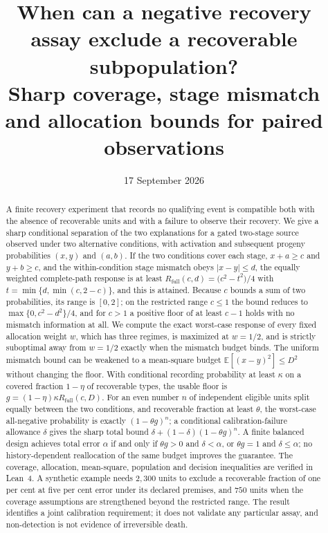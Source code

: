 \documentclass[11pt]{article}
\title{When can a negative recovery assay exclude a recoverable
subpopulation?\\[4pt]
\large Sharp coverage, stage mismatch and allocation bounds for paired
observations}
\author{\PaperAuthor}
\date{17 September 2026}
\theoremstyle{definition}
\theoremstyle{remark}
\newcommand{\E}{\mathbb{E}}
\newcommand{\Rfull}{R_{\mathrm{full}}}
\begin{document}
\maketitle

\begin{abstract}
A finite recovery experiment that records no qualifying event is compatible both
with the absence of recoverable units and with a failure to observe their
recovery. We give a sharp conditional separation of the two explanations for a
gated two-stage source observed under two alternative conditions, with
activation and subsequent progeny probabilities $(x,y)$ and $(a,b)$. If the two
conditions cover each stage, $x+a\ge c$ and $y+b\ge c$, and the within-condition
stage mismatch obeys $|x-y|\le d$, the equally weighted complete-path response
is at least $\Rfull(c,d)=\bigl(c^2-t^2\bigr)/4$ with $t=\min\{d,\min(c,2-c)\}$,
and this is attained. Because $c$ bounds a sum of two probabilities, its range
is $[0,2]$; on the restricted range $c\le1$ the bound reduces to
$\max\{0,c^2-d^2\}/4$, and for $c>1$ a positive floor of at least $c-1$ holds
with no mismatch information at all. We compute the exact worst-case response of
every fixed allocation weight $w$, which has three regimes, is maximized at
$w=1/2$, and is strictly suboptimal away from $w=1/2$ exactly when the mismatch
budget binds. The uniform mismatch bound can be weakened to a mean-square budget
$\E[(x-y)^2]\le D^2$ without changing the floor. With conditional recording
probability at least $\kappa$ on a covered fraction $1-\eta$ of recoverable
types, the usable floor is $g=(1-\eta)\kappa\Rfull(c,D)$. For an even number $n$
of independent eligible units split equally between the two conditions, and
recoverable fraction at least $\theta$, the worst-case all-negative probability
is exactly $(1-\theta g)^n$; a conditional calibration-failure allowance $\delta$
gives the sharp total bound $\delta+(1-\delta)(1-\theta g)^n$. A finite balanced
design achieves total error $\alpha$ if and only if $\theta g>0$ and
$\delta<\alpha$, or $\theta g=1$ and $\delta\le\alpha$; no history-dependent
reallocation of the same budget improves the guarantee. The coverage, allocation,
mean-square, population and decision inequalities are verified in Lean~4. A
synthetic example needs $2{,}300$ units to exclude a recoverable fraction of one
per cent at five per cent error under its declared premises, and $750$ units when
the coverage assumptions are strengthened beyond the restricted range. The result
identifies a joint calibration requirement; it does not validate any particular
assay, and non-detection is not evidence of irreversible death.
\end{abstract}
\end{document}
